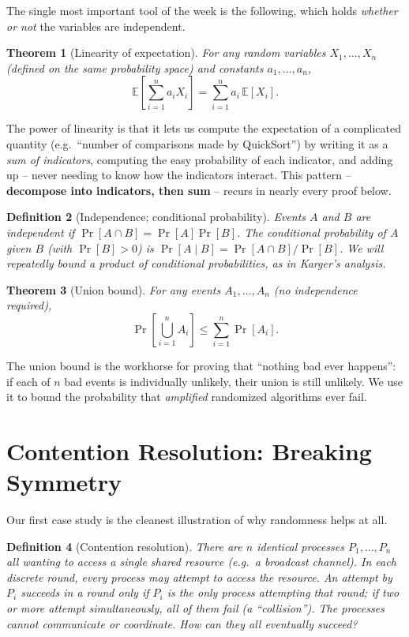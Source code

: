 \documentclass[11pt]{article}
\newtheorem{theorem}{Theorem}[section]
\newtheorem{definition}[theorem]{Definition}
\begin{document}
The single most important tool of the week is the following, which holds
\emph{whether or not} the variables are independent.

\begin{theorem}[Linearity of expectation]
\label{thm:linearity}
For any random variables $X_1, \ldots, X_n$ (defined on the same probability
space) and constants $a_1, \ldots, a_n$,
\[
    \mathbb{E}\!\left[\sum_{i=1}^{n} a_i X_i\right] = \sum_{i=1}^{n} a_i\, \mathbb{E}[X_i].
\]
\end{theorem}

The power of linearity is that it lets us compute the expectation of a complicated
quantity (e.g.\ ``number of comparisons made by QuickSort'') by writing it as a
\emph{sum of indicators}, computing the easy probability of each indicator, and
adding up -- never needing to know how the indicators interact. This pattern --
\textbf{decompose into indicators, then sum} -- recurs in nearly every proof below.

\begin{definition}[Independence; conditional probability]
Events $A$ and $B$ are \emph{independent} if $\Pr[A \cap B] = \Pr[A]\Pr[B]$. The
\emph{conditional probability} of $A$ given $B$ (with $\Pr[B] > 0$) is $\Pr[A \mid
B] = \Pr[A \cap B] / \Pr[B]$. We will repeatedly bound a product of conditional
probabilities, as in Karger's analysis.
\end{definition}

\begin{theorem}[Union bound]
\label{thm:union}
For any events $A_1, \ldots, A_n$ (no independence required),
\[
    \Pr\!\left[\bigcup_{i=1}^{n} A_i\right] \le \sum_{i=1}^{n} \Pr[A_i].
\]
\end{theorem}

The union bound is the workhorse for proving that ``nothing bad ever happens'': if
each of $n$ bad events is individually unlikely, their union is still unlikely.
We use it to bound the probability that \emph{amplified} randomized algorithms
ever fail.

\section{Contention Resolution: Breaking Symmetry}

Our first case study is the cleanest illustration of why randomness helps at all.

\begin{definition}[Contention resolution]
There are $n$ identical processes $P_1, \ldots, P_n$ all wanting to access a single
shared resource (e.g.\ a broadcast channel). In each discrete \emph{round}, every
process may attempt to access the resource. An attempt by $P_i$ \emph{succeeds} in
a round only if $P_i$ is the \emph{only} process attempting that round; if two or
more attempt simultaneously, all of them fail (a ``collision''). The processes
cannot communicate or coordinate. How can they all eventually succeed?
\end{definition}
\end{document}
